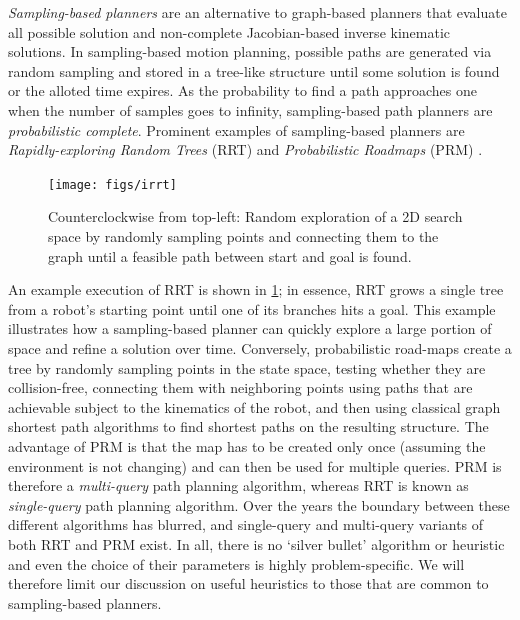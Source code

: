 \textsl{Sampling-based planners} are an alternative to graph-based planners that evaluate all possible solution and non-complete Jacobian-based inverse kinematic solutions.
In sampling-based motion planning, possible paths are generated via random sampling and stored in a tree-like structure until some solution is found or the alloted time expires. As the probability to find a path approaches one when the number of samples goes to infinity, sampling-based path planners are \textsl{probabilistic complete}. Prominent examples of sampling-based planners are \textsl{Rapidly-exploring Random Trees} (RRT)\cite{lavalle1998rapidly} and \textsl{Probabilistic Roadmaps} (PRM) \cite{kavraki1996probabilistic}.

\begin{figure}[!]
    \centering
    \texttt{[image: figs/irrt]}
    \caption{Counterclockwise from top-left: Random exploration of a 2D search space by randomly sampling points and connecting them to the graph until a feasible path between start and goal is found.\label{fig:rrt}}
\end{figure}

An example execution of RRT is shown in \cref{fig:rrt}; in essence, RRT grows a single tree from a robot's starting point until one of its branches hits a goal.
This example illustrates how a sampling-based planner can quickly explore a large portion of space and refine a solution over time.
Conversely, probabilistic road-maps create a tree by randomly sampling points in the state space, testing whether they are collision-free, connecting them with neighboring points using paths that are achievable subject to the kinematics of the robot, and then using classical graph shortest path algorithms to find shortest paths on the resulting structure.
The advantage of PRM is that the map has to be created only once (assuming the environment is not changing) and can then be used for multiple queries. PRM is therefore a \textsl{multi-query} path planning algorithm, whereas RRT is known as \textsl{single-query} path planning algorithm.
Over the years the boundary between these different algorithms has blurred, and single-query and multi-query variants of both RRT and PRM exist.
In all, there is no `silver bullet' algorithm or heuristic and even the choice of their parameters is highly problem-specific. We will therefore limit our discussion on useful heuristics to those that are common to sampling-based planners.

